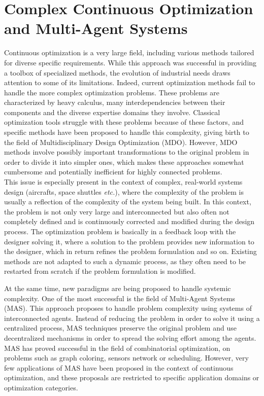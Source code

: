  \label{introduction}

\section*{Complex Continuous Optimization and Multi-Agent Systems}

Continuous optimization is a very large field, including various methods tailored for diverse specific requirements. While this approach was successful in providing a toolbox of specialized methods, the evolution of industrial needs draws attention to some of its limitations. Indeed, current optimization methods fail to handle the more complex optimization problems. These problems are characterized by heavy calculus, many interdependencies between their components and the diverse expertise domains they involve. Classical optimization tools struggle with these problems because of these factors, and specific methods have been proposed to handle this complexity, giving birth to the field of Multidisciplinary Design Optimization (MDO). However, MDO methods involve possibly important transformations to the original problem in order to divide it into simpler ones, which makes these approaches somewhat cumbersome and potentially inefficient for highly connected problems.\\
This issue is especially present in the context of complex, real-world systems design (aircrafts, space shuttles \emph{etc.}), where the complexity of the problem is usually a reflection of the complexity of the system being built. In this context, the problem is not only very large and interconnected but also often not completely defined and is continuously corrected and modified during the design process. The optimization problem is basically in a feedback loop with the designer solving it, where a solution to the problem provides new information to the designer, which in return refines the problem formulation and so on. Existing methods are not adapted to such a dynamic process, as they often need to be restarted from scratch if the problem formulation is modified.

At the same time, new paradigms are being proposed to handle systemic complexity. One of the most successful is the field of Multi-Agent Systems (MAS). This approach proposes to handle problem complexity using systems of interconnected agents. Instead of reducing the problem in order to solve it using a centralized process, MAS techniques preserve the original problem and use decentralized mechanisms in order to spread the solving effort among the agents. MAS has proved successful in the field of combinatorial optimization, on problems such as graph coloring, sensors network or scheduling. However, very few applications of MAS have been proposed in the context of continuous optimization, and these proposals are restricted to specific application domains or optimization categories.


